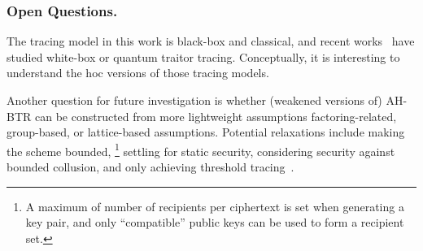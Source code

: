 \subsubsection{Open Questions.}
The tracing model in this work is black-box and classical, and recent works~\cite{C:Zhandry21,TCC:Zhandry20} have studied white-box or quantum traitor tracing.
Conceptually, it is interesting to understand the \ad hoc versions of those tracing models.

Another question for future investigation is whether
(weakened versions of) AH-BTR can be constructed from more lightweight assumptions factoring-related, group-based, or lattice-based assumptions.
Potential relaxations include
making the scheme bounded,%
\footnote{A maximum of number of recipients per ciphertext is set when generating a key pair, and only ``compatible'' public keys can be used to form a recipient set.}
settling for static security,
considering security against bounded collusion, and
only achieving threshold tracing~\cite{C:NaoPin98}.
